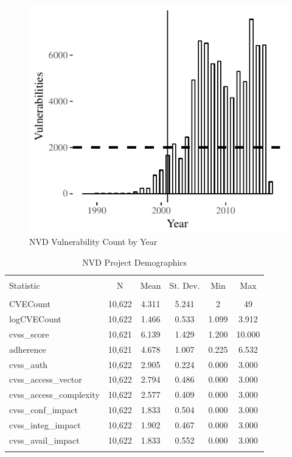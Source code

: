 \begin{figure}
	\centering
	\includegraphics[width=.6\columnwidth]{nvd_vulns_year}
	\caption{NVD Vulnerability Count by Year}
	\label{fig:nvd_vulns_year}
\end{figure}
\begin{table}[!htbp] \centering 
	\caption{NVD Project Demographics} 
	\label{tab:nvd_demog} 
	\begin{small}
	\begin{tabular}{@{\extracolsep{5pt}}lccccc} 
		\\[-1.8ex]\hline 
		\hline \\[-1.8ex] 
		Statistic & \multicolumn{1}{c}{N} & \multicolumn{1}{c}{Mean} & \multicolumn{1}{c}{St. Dev.} & \multicolumn{1}{c}{Min} & \multicolumn{1}{c}{Max} \\ 
		\hline \\[-1.8ex] 
		CVECount & 10,622 & 4.311 & 5.241 & 2 & 49 \\ 
		logCVECount & 10,622 & 1.466 & 0.533 & 1.099 & 3.912 \\ 
		cvss\_score & 10,621 & 6.139 & 1.429 & 1.200 & 10.000 \\ 
		adherence & 10,621 & 4.678 & 1.007 & 0.225 & 6.532 \\ 
		cvss\_auth & 10,622 & 2.905 & 0.224 & 0.000 & 3.000 \\ 
		cvss\_access\_vector & 10,622 & 2.794 & 0.486 & 0.000 & 3.000 \\ 
		cvss\_access\_complexity & 10,622 & 2.577 & 0.409 & 0.000 & 3.000 \\ 
		cvss\_conf\_impact & 10,622 & 1.833 & 0.504 & 0.000 & 3.000 \\ 
		cvss\_integ\_impact & 10,622 & 1.902 & 0.467 & 0.000 & 3.000 \\ 
		cvss\_avail\_impact & 10,622 & 1.833 & 0.552 & 0.000 & 3.000 \\ 
		\hline \\[-1.8ex] 
	\end{tabular} 
		\end{small}
	
\end{table} 

